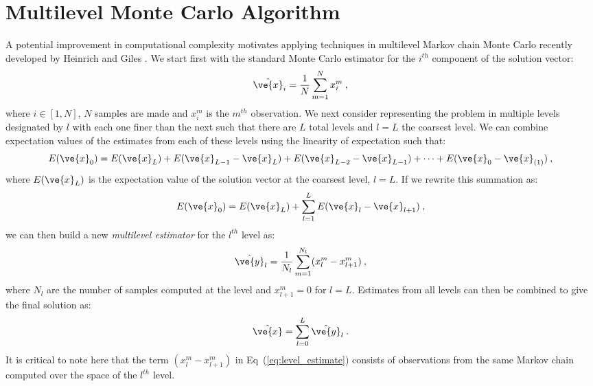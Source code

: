 \documentclass[note]{TechNote}
\begin{document}
\section{Multilevel Monte Carlo Algorithm}
\label{sec:algorithm}
A potential improvement in computational complexity motivates applying
techniques in multilevel Markov chain Monte Carlo recently developed
by Heinrich \cite{heinrich_2001} and Giles \cite{giles_2008}. We start
first with the standard Monte Carlo estimator for the $i^{th}$
component of the solution vector:
\begin{equation}
  \hat{\ve{x}}_i = \frac{1}{N} \sum_{m=1}^N x^m_i\:,
  \label{eq:standard_estimator}
\end{equation}
where $i \in [1,N]$, $N$ samples are made and $x^m_i$ is the $m^{th}$
observation. We next consider representing the problem in multiple
levels designated by $l$ with each one finer than the next such that
there are $L$ total levels and $l=L$ the coarsest level. We can
combine expectation values of the estimates from each of these levels
using the linearity of expectation such that:
\begin{equation}
  E(\ve{x}_{0}) = E(\ve{x}_{L}) + E(\ve{x}_{L-1} - \ve{x}_{L}) +
  E(\ve{x}_{L-2} - \ve{x}_{L-1}) + \dots + E(\ve{x}_{0} -
  \ve{x}_{(1)})\:,
  \label{eq:linearity_of_expectation}
\end{equation}
where $E(\ve{x}_{L})$ is the expectation value of the solution vector
at the coarsest level, $l = L$.  If we rewrite this summation as:
\begin{equation}
  E(\ve{x}_{0}) = E(\ve{x}_{L}) + \sum_{l=1}^L E(\ve{x}_{l} -
  \ve{x}_{l+1})\:,
  \label{eq:linearity_of_expectation_sum}
\end{equation}
we can then build a new \textit{multilevel estimator} for the $l^{th}$
level as:
\begin{equation}
    \hat{\ve{y}}_{l} = \frac{1}{N_l} \sum_{m=1}^{N_l} (x^m_{l} -
    x^m_{l+1})\:,
    \label{eq:level_estimate}
\end{equation}
where $N_l$ are the number of samples computed at the level and
$x^m_{l+1} = 0$ for $l=L$. Estimates from all levels can then be
combined to give the final solution as:
\begin{equation}
  \hat{\ve{x}} = \sum_{l=0}^L \hat{\ve{y}}_{l}\:.
  \label{eq:multilevel_estimator}
\end{equation}
It is critical to note here that the term $(x^m_{l} - x^m_{l+1})$
in Eq~(\ref{eq:level_estimate}) consists of observations from the same
Markov chain computed over the space of the $l^{th}$ level. 
\end{document}
